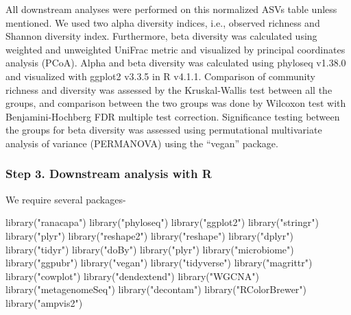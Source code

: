 \documentclass[
]{article}
\newenvironment{Shaded}{\begin{snugshade}}{\end{snugshade}}
\newcommand{\FunctionTok}[1]{\textcolor[rgb]{0.00,0.00,0.00}{#1}}
\newcommand{\NormalTok}[1]{#1}
\newcommand{\StringTok}[1]{\textcolor[rgb]{0.31,0.60,0.02}{#1}}
\begin{document}
All downstream analyses were performed on this normalized ASVs table
unless mentioned. We used two alpha diversity indices, i.e., observed
richness and Shannon diversity index. Furthermore, beta diversity was
calculated using weighted and unweighted UniFrac metric and visualized
by principal coordinates analysis (PCoA). Alpha and beta diversity was
calculated using phyloseq v1.38.0 and visualized with ggplot2 v3.3.5 in
R v4.1.1. Comparison of community richness and diversity was assessed by
the Kruskal-Wallis test between all the groups, and comparison between
the two groups was done by Wilcoxon test with Benjamini-Hochberg FDR
multiple test correction. Significance testing between the groups for
beta diversity was assessed using permutational multivariate analysis of
variance (PERMANOVA) using the ``vegan'' package.

\hypertarget{step-3.-downstream-analysis-with-r}{%
\subsubsection{Step 3. Downstream analysis with
R}\label{step-3.-downstream-analysis-with-r}}

We require several packages-

\begin{Shaded}
\begin{Highlighting}[]
\FunctionTok{library}\NormalTok{(}\StringTok{"ranacapa"}\NormalTok{)}
\FunctionTok{library}\NormalTok{(}\StringTok{"phyloseq"}\NormalTok{)}
\FunctionTok{library}\NormalTok{(}\StringTok{"ggplot2"}\NormalTok{)}
\FunctionTok{library}\NormalTok{(}\StringTok{"stringr"}\NormalTok{)}
\FunctionTok{library}\NormalTok{(}\StringTok{"plyr"}\NormalTok{)}
\FunctionTok{library}\NormalTok{(}\StringTok{"reshape2"}\NormalTok{)}
\FunctionTok{library}\NormalTok{(}\StringTok{"reshape"}\NormalTok{)}
\FunctionTok{library}\NormalTok{(}\StringTok{"dplyr"}\NormalTok{)}
\FunctionTok{library}\NormalTok{(}\StringTok{"tidyr"}\NormalTok{)}
\FunctionTok{library}\NormalTok{(}\StringTok{"doBy"}\NormalTok{)}
\FunctionTok{library}\NormalTok{(}\StringTok{"plyr"}\NormalTok{)}
\FunctionTok{library}\NormalTok{(}\StringTok{"microbiome"}\NormalTok{)}
\FunctionTok{library}\NormalTok{(}\StringTok{"ggpubr"}\NormalTok{)}
\FunctionTok{library}\NormalTok{(}\StringTok{"vegan"}\NormalTok{)}
\FunctionTok{library}\NormalTok{(}\StringTok{"tidyverse"}\NormalTok{)}
\FunctionTok{library}\NormalTok{(}\StringTok{"magrittr"}\NormalTok{)}
\FunctionTok{library}\NormalTok{(}\StringTok{"cowplot"}\NormalTok{)}
\FunctionTok{library}\NormalTok{(}\StringTok{"dendextend"}\NormalTok{)}
\FunctionTok{library}\NormalTok{(}\StringTok{"WGCNA"}\NormalTok{)}
\FunctionTok{library}\NormalTok{(}\StringTok{"metagenomeSeq"}\NormalTok{)}
\FunctionTok{library}\NormalTok{(}\StringTok{"decontam"}\NormalTok{)}
\FunctionTok{library}\NormalTok{(}\StringTok{"RColorBrewer"}\NormalTok{)}
\FunctionTok{library}\NormalTok{(}\StringTok{"ampvis2"}\NormalTok{)}
\end{Highlighting}
\end{Shaded}
\end{document}
